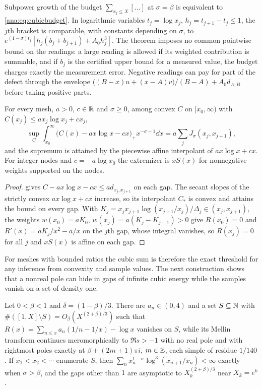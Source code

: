 Subpower growth of the budget $\sum_{x_j\le X}[\dots]$ at $\sigma=\beta$ is equivalent to
\eqref{ana:eq:cubicbudget}. In logarithmic variables $t_j=\log x_j$, $h_j=t_{j+1}-t_j\le1$, the
$j$th bracket is comparable, with constants depending on $\sigma$, to
$e^{(1-\sigma)t_j}[h_j(b_j+b_{j+1})+A_0h_j^3]$. The theorem imposes no common pointwise bound
on the readings: a large reading is allowed if its weighted contribution is summable, and if
$b_j$ is the certified upper bound for a measured value, the budget charges exactly the
measurement error. Negative readings can pay for part of the defect through the envelope
$\bigl((B-x)u+(x-A)v\bigr)/(B-A)+A_0d_{A,B}$ before taking positive parts.

\begin{theorem}\label{ana:thm:cubicopt}
For every mesh, $a>0$, $c\in\mathbb{R}$ and $\sigma\ge0$, among convex $C$ on $[x_0,\infty)$ with
$C(x_j)\le ax_j\log x_j+cx_j$,
\[
 \sup_C\int_{x_0}^\infty\bigl(C(x)-ax\log x-cx\bigr)_+x^{-\sigma-1}\dd x=a\sum_jJ_\sigma(x_j,x_{j+1}),
\]
and the supremum is attained by the piecewise affine interpolant of $ax\log x+cx$. For integer
nodes and $c=-a\log x_0$ the extremizer is $xS(x)$ for nonnegative weights supported on the
nodes.
\end{theorem}

\begin{proof}
 gives $C-ax\log x-cx\le ad_{x_j,x_{j+1}}$ on each gap. The secant slopes of
the strictly convex $ax\log x+cx$ increase, so its interpolant $C_*$ is convex and attains the
bound on every gap. With $K_j=x_jx_{j+1}\log(x_{j+1}/x_j)/\Delta_j\in(x_j,x_{j+1})$, the weights
$w(x_0)=aK_0$, $w(x_j)=a(K_j-K_{j-1})>0$ give $R(x_0)=0$ and
$R'(x)=aK_j/x^2-a/x$ on the $j$th gap, whose integral vanishes, so $R(x_j)=0$ for all $j$ and
$xS(x)$ is affine on each gap.
\end{proof}

For meshes with bounded ratios the cubic sum is therefore the exact threshold for any inference
from convexity and sample values. The next construction shows that a nonreal pole can hide in
gaps of infinite cubic energy while the samples vanish on a set of density one.

\begin{theorem}\label{ana:thm:densityone}
Let $0<\beta<1$ and $\delta=(1-\beta)/3$. There are $a_n\in(0,4)$ and a set
$S\subseteq\mathbb{N}$ with $\#([1,X]\setminus S)=O_\beta(X^{(2+\beta)/3})$ such that
$R(x)=\sum_{n\le x}a_n(1/n-1/x)-\log x$ vanishes on $S$, while its Mellin transform continues
meromorphically to $\Re s>-1$ with no real pole and with rightmost poles exactly at
$\beta+(2m+1)\pi i$, $m\in\mathbb{Z}$, each simple of residue $1/140$. If $x_1<x_2<\cdots$ enumerate
$S$, then $\sum_nx_n^{1-\sigma}\log^3(x_{n+1}/x_n)<\infty$ exactly when $\sigma>\beta$, and the
gaps other than $1$ are asymptotic to $X_k^{(2+\beta)/3}$ near $X_k=e^k$.
\end{theorem}

